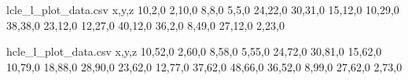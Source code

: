 \begingroup\newif\ifmy
{}
\ifmy
\begin{filecontents*}{lcle_l_plot_data.csv}
x,y,z
10,2,0
2,10,0
8,8,0
5,5,0
24,22,0
30,31,0
15,12,0
10,29,0
38,38,0
23,12,0
12,27,0
40,12,0
36,2,0
8,49,0
27,12,0
2,23,0
\end{filecontents*}
\fi\endgroup

\begingroup\newif\ifmy
{}
\ifmy
\begin{filecontents*}{hcle_l_plot_data.csv}
x,y,z
10,52,0
2,60,0
8,58,0
5,55,0
24,72,0
30,81,0
15,62,0
10,79,0
18,88,0
28,90,0
23,62,0
12,77,0
37,62,0
48,66,0
36,52,0
8,99,0
27,62,0
2,73,0
\end{filecontents*}
\fi\endgroup